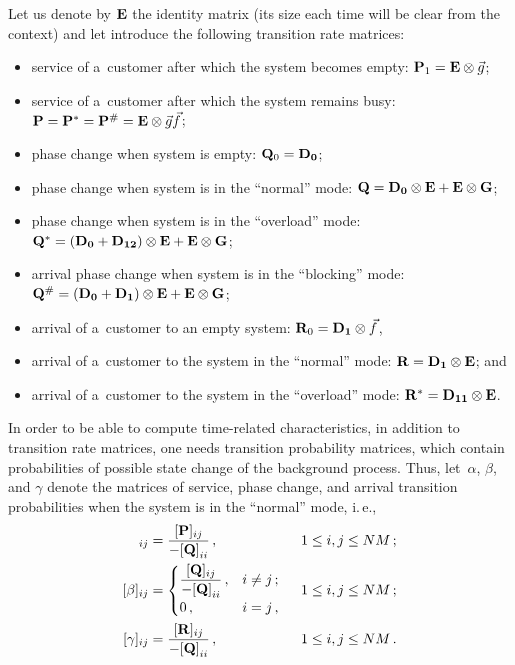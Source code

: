 \begin{multicols}{2}
Let us denote by $\mathbf{E}$ the identity matrix (its size each time will 
be clear from the context)
and let introduce the following transition rate matrices:
\begin{itemize}
    \item service of a~customer after which the system becomes empty: 
    $\mathbf{P}_1=\mathbf{E}\otimes {\vec g}$;
    \item service of a~customer after which the system remains busy: 
    $\mathbf{P}=\mathbf{P}^*=\mathbf{P}^{\#}=\mathbf{E}\otimes {\vec g}{\vec f}$;
    \item phase change when system is empty: $\mathbf{Q}_0=\mathbf{D_0}$;
    \item phase change when system is in the ``normal'' mode: 
    $\mathbf{Q}=\mathbf{D_0}\otimes \mathbf{E} + \mathbf{E} \otimes \mathbf{G}$;
    \item phase change when system is in the ``overload'' mode: 
    $\mathbf{Q}^*=(\mathbf{D_0}+\mathbf{D_{12}})\otimes \mathbf{E} + \mathbf{E} \otimes \mathbf{G}$;
        \item arrival phase change when system is in the ``blocking'' mode: 
        $\mathbf{Q}^{\#}=(\mathbf{D_0}+\mathbf{D_{1}})\otimes \mathbf{E} + \mathbf{E} \otimes 
        \mathbf{G}$;
    \item arrival of a~customer to an empty system: $\bmx{R}_0\linebreak =\bmx{D_1} \otimes
    {\vec f}$,
    \item arrival of a~customer to the system in the ``normal'' mode: 
    $\mathbf{R}=\mathbf{D_1}\otimes \mathbf{E}$; and
    \item arrival of a~customer to the system in the ``overload'' mode: 
    $\mathbf{R}^*=\mathbf{D_{11}}\otimes \mathbf{E}$.
\end{itemize}

In order to be able to compute time-related characteristics,
in addition to transition rate matrices, one needs
transition probability matrices, which contain probabilities 
of possible state change of the background process.
Thus, let~$\alpha$, $\beta$, and $\gamma$ denote the matrices of
service, phase change, and arrival transition probabilities
when the system is in the ``normal'' mode,
i.\,e.,
\begin{alignat*}{3}
[\alpha]_{ij}  
&=
\fr{[\bmx{P}]_{ij} }{-{[\bmx{Q}]}_{ii}}\,, &\enskip 1 &\le i, j \le NM\,;
\\
[\beta]_{ij}  
&=\begin{cases}
\fr{[\bmx{Q}]_{ij}}{-{[\bmx{Q}]}_{ii}}\,,  & i \neq j\,; \\
0\,, & i = j\,,
\end{cases}
&\enskip 1 &\le i,j \le NM\,;
\\
[\gamma]_{ij}  
&=\fr{[\bmx{R}]_{ij} }{-{[\bmx{Q}]}_{ii}}\,, &\enskip 1 &\le i,j \le NM\,.
\end{alignat*}


\end{multicols}
